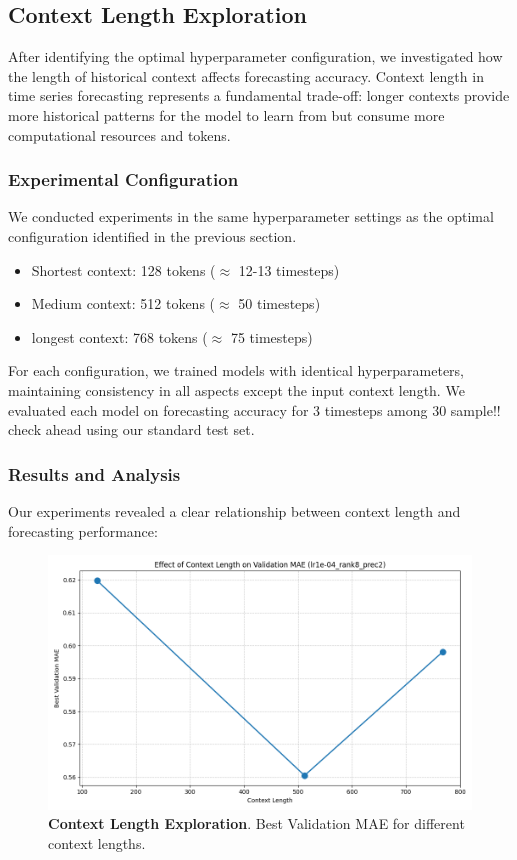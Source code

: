\documentclass{article}
\begin{document}
\subsection*{Context Length Exploration}
After identifying the optimal hyperparameter configuration, we investigated how the length of historical context affects forecasting accuracy. Context length in time series forecasting represents a fundamental trade-off: longer contexts provide more historical patterns for the model to learn from but consume more computational resources and tokens.
\subsubsection*{Experimental Configuration}
We conducted experiments in the same hyperparameter settings as the optimal configuration identified in the previous section.
\begin{itemize}
    \item Shortest context: 128 tokens ($\approx$ 12-13 timesteps)
    \item Medium context: 512 tokens ($\approx$ 50 timesteps)
    \item longest context: 768 tokens ($\approx$ 75 timesteps)
\end{itemize}
For each configuration, we trained models with identical hyperparameters, maintaining consistency in all aspects except the input context length. We evaluated each model on forecasting accuracy for 3 timesteps among 30 sample!! check ahead using our standard test set.

\subsubsection*{Results and Analysis}
Our experiments revealed a clear relationship between context length and forecasting performance:
\begin{figure} [H]
    \centering
    \begin{minipage}{0.48\textwidth}
        \centering
        \includegraphics[width=\textwidth]{context_length}
    \end{minipage}
    \caption{\textbf{Context Length Exploration}. Best Validation MAE for different context lengths.}
    \label{fig:context_length}
\end{figure}
\end{document}
